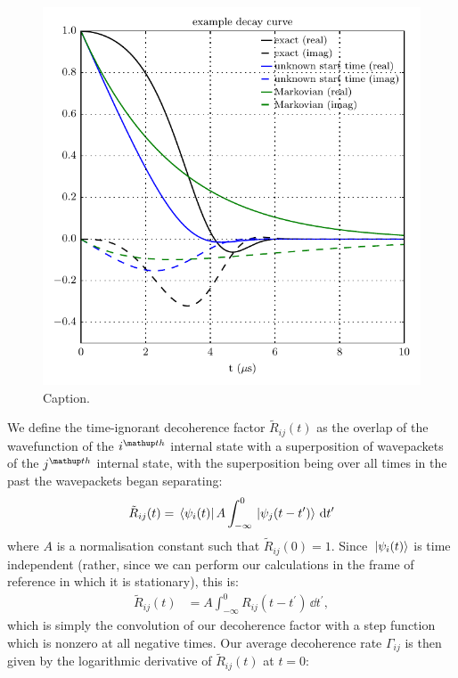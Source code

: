 \begin{figure}[t]
    \centerfloat
    \includegraphics{figures/hidden_variables/decoherence_factor_example.pdf}
    \caption{Caption.}
    \label{fig:decoherence_factor_example}
\end{figure}

We define the time-ignorant decoherence factor $\tilde R_{ij}(t)$ as the overlap of the wavefunction of the $i^\up{th}$ internal state with a superposition of wavepackets of the $j^\up{th}$ internal state, with the superposition being over all times in the past the wavepackets began separating:
\begin{align}
\tilde R_{ij}(t) &= \bra{\psi_i(t)} A\int_{-\infty}^0 \ket{\psi_j(t - t^\prime)} \,\dd t^\prime\\
\end{align}
where $A$ is a normalisation constant such that $\tilde R_{ij}(0) = 1$.
Since $\ket{\psi_i(t)}$ is time independent (rather, since we can perform our calculations in the frame of reference in which it is stationary), this is:
\begin{align}
\tilde R_{ij}(t) &= A\int_{-\infty}^0 R_{ij}(t - t^\prime) \,\dd t^\prime,
\end{align}
which is simply the convolution of our decoherence factor with a step function which is nonzero at all negative times.
Our average decoherence rate $\Gamma_{ij}$ is then given by the logarithmic derivative of $\tilde R_{ij}(t)$ at $t=0$:

